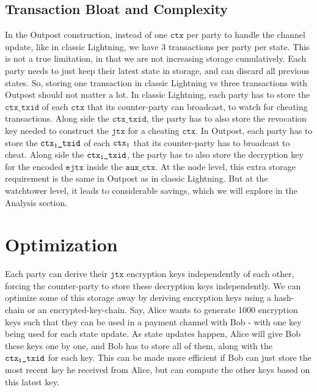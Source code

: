 \subsection{Transaction Bloat and Complexity}
In the Outpost construction, instead of one $\texttt{ctx}$ per party to handle the channel update, like in classic Lightning, we have 3 transactions per party per state. This is not a true limitation, in that we are not increasing storage cumulatively. Each party needs to just keep their latest state in storage, and can discard all previous states. So, storing one transaction in classic Lightning vs three transactions with Outpost should not matter a lot. In classic Lightning, each party has to store the $\texttt{ctx\_txid}$ of each $\texttt{ctx}$ that its counter-party can broadcast, to watch for cheating transactions. Along side the $\texttt{ctx\_txid}$, the party has to also store the revocation key needed to construct the $\texttt{jtx}$ for a cheating $\texttt{ctx}$. In Outpost, each party has to store the $\texttt{ctx\textsubscript{1}\_txid}$ of each $\texttt{ctx\textsubscript{1}}$ that its counter-party has to broadcast to cheat. Along side the $\texttt{ctx\textsubscript{1}\_txid}$, the party has to also store the decryption key for the encoded $\texttt{ejtx}$ inside the $\texttt{aux\_ctx}$. At the node level, this extra storage requirement is the same in Outpost as in classic Lightning. But at the watchtower level, it leads to considerable savings, which we will explore in the Analysis section.

\section{Optimization}
Each party can derive their $\texttt{jtx}$ encryption keys independently of each other, forcing the counter-party to store these decryption keys independently. We can optimize some of this storage away by deriving encryption keys using a hash-chain or an encrypted-key-chain. Say, Alice wants to generate 1000 encryption keys such that they can be used in a payment channel with Bob - with one key being used for each state update. As state updates happen, Alice will give Bob these keys one by one, and Bob has to store all of them, along with the $\texttt{ctx\textsubscript{1}\_txid}$ for each key. This can be made more efficient if Bob can just store the most recent key he received from Alice, but can compute the other keys based on this latest key. 

